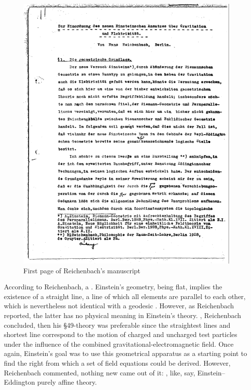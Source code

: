 \documentclass[final]{article}
\newcommand{\manu}[1]{\citep[#1]{Reichenbach1928b}}
\begin{document}
\begin{figure}
\centering
\includegraphics[scale=0.25]{1928ReichebachTele.png}
\caption{\label{fig:reichenbachfirst} First page of Reichenbach's manuscript \citep{Reichenbach1928b}}
\end{figure}

According to Reichenbach, a  \manu{7}. Einstein's geometry, being flat, implies the existence of a straight line, a line of which all elements are parallel to each other, which is nevertheless not identical with a geodesic \citep[224]{Einstein19282}. However, as Reichenbach reported, the latter has no physical meaning in Einstein's theory. , Reichenbach concluded, then his \S49-theory was preferable since the straightest lines and shortest line correspond to the motion of charged and uncharged test particles under the influence of the combined gravitational-electromagnetic field. Once again, Einstein's goal was to use this geometrical apparatus as a starting point to find the right  from which a set of field equations could be derived. However, Reichenbach commented, nothing new came out of it:  \manu{6}, like, say, Einstein--Eddington purely affine theory. 
\end{document}
